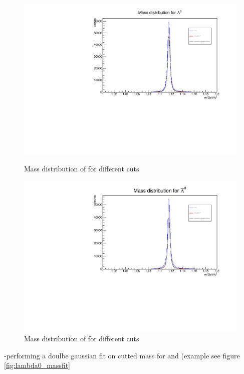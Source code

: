 		\begin{figure}
			\centering
				\includegraphics[width=1.1\textwidth]{./plots/lambda0_m_diffcuts.pdf}
			\caption{Mass distribution of \lam for different cuts}
			\label{fig:lambda0_massdiffcuts}
			
				\includegraphics[width=1.1\textwidth]{./plots/antiLambda0_m_diffcuts.pdf}
			\caption{Mass distribution of \alam for different cuts}
			\label{fig:antilambda0_massdiffcuts}
		\end{figure}
		
		-performing a doulbe gaussian fit on cutted mass for \lam and \alam (example see figure \ref{fig:lambda0_massfit}
		
